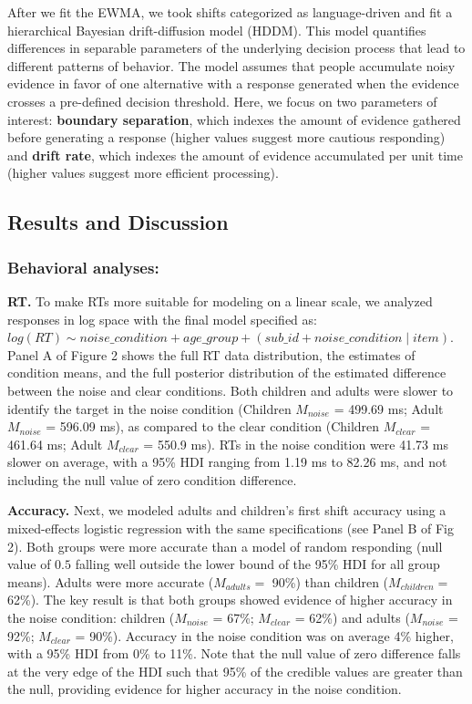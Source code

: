 \documentclass[10pt, letterpaper]{article}
\begin{document}
After we fit the EWMA, we took shifts categorized as language-driven and
fit a hierarchical Bayesian drift-diffusion model (HDDM). This model
quantifies differences in separable parameters of the underlying
decision process that lead to different patterns of behavior. The model
assumes that people accumulate noisy evidence in favor of one
alternative with a response generated when the evidence crosses a
pre-defined decision threshold. Here, we focus on two parameters of
interest: \textbf{boundary separation}, which indexes the amount of
evidence gathered before generating a response (higher values suggest
more cautious responding) and \textbf{drift rate}, which indexes the
amount of evidence accumulated per unit time (higher values suggest more
efficient processing).

\subsection{Results and Discussion}\label{results-and-discussion}

\subsubsection{Behavioral analyses:}\label{behavioral-analyses}

\textbf{RT.} To make RTs more suitable for modeling on a linear scale,
we analyzed responses in log space with the final model specified as:
\texttt{$log(RT) \sim noise\_condition + age\_group + (sub\_id + noise\_condition \mid item)$}.
Panel A of Figure 2 shows the full RT data distribution, the estimates
of condition means, and the full posterior distribution of the estimated
difference between the noise and clear conditions. Both children and
adults were slower to identify the target in the noise condition
(Children \(M_{noise}\) = 499.69 ms; Adult \(M_{noise}\) = 596.09 ms),
as compared to the clear condition (Children \(M_{clear}\) = 461.64 ms;
Adult \(M_{clear}\) = 550.9 ms). RTs in the noise condition were 41.73
ms slower on average, with a 95\% HDI ranging from 1.19 ms to 82.26 ms,
and not including the null value of zero condition difference.

\textbf{Accuracy.} Next, we modeled adults and children's first shift
accuracy using a mixed-effects logistic regression with the same
specifications (see Panel B of Fig 2). Both groups were more accurate
than a model of random responding (null value of \(0.5\) falling well
outside the lower bound of the 95\% HDI for all group means). Adults
were more accurate (\(M_{adults} =\) 90\%) than children
(\(M_{children} =\) 62\%). The key result is that both groups showed
evidence of higher accuracy in the noise condition: children
(\(M_{noise}\) = 67\%; \(M_{clear}\) = 62\%) and adults (\(M_{noise}\) =
92\%; \(M_{clear}\) = 90\%). Accuracy in the noise condition was on
average 4\% higher, with a 95\% HDI from 0\% to 11\%. Note that the null
value of zero difference falls at the very edge of the HDI such that
95\% of the credible values are greater than the null, providing
evidence for higher accuracy in the noise condition.
\end{document}
